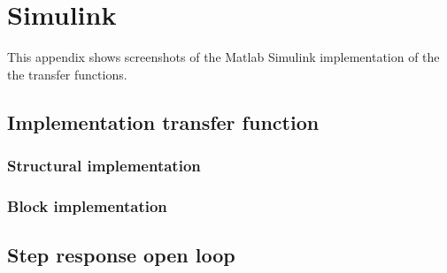 \section{Simulink} \label{app:simulink}

This appendix shows screenshots of the Matlab Simulink implementation of the the transfer functions.


\subsection{Implementation transfer function} \label{app:simulink:tf}

\subsubsection{Structural implementation} \label{app:simulink:tf:structure}

\subsubsection{Block implementation} \label{app:simulink:tf:block}

\subsection{Step response open loop} \label{app:simulink:open_loop}

